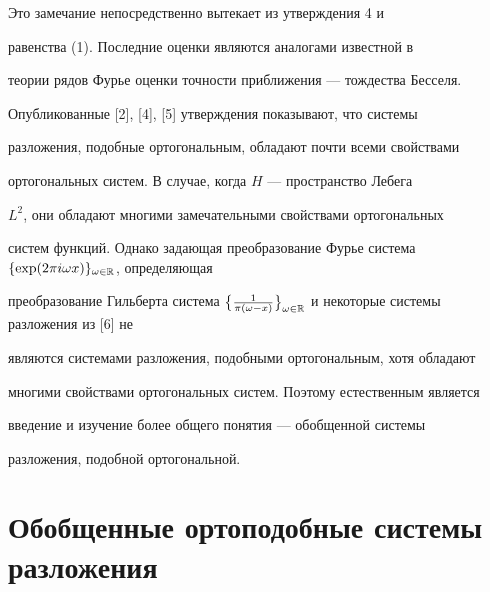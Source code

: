 Это замечание непосредственно вытекает из утверждения 4 и


равенства (1). Последние оценки являются аналогами известной в


теории рядов Фурье оценки точности приближения --- тождества Бесселя.





Опубликованные [2], [4], [5] утверждения показывают, что системы


разложения, подобные ортогональным, обладают почти всеми свойствами


ортогональных систем. В случае, когда $H$ --- пространство Лебега


$L^2$, они обладают многими замечательными свойствами ортогональных


систем функций. Однако задающая преобразование Фурье система $\{\text


{exp}(2\pi i\omega x)\}_{\omega\in\Bbb R}$, определяющая


преобразование Гильберта система $\big\{\frac1{\pi(\omega-x)}


\big\}_{\omega\in\Bbb R}$ и некоторые системы разложения из [6] не


являются системами разложения, подобными ортогональным, хотя обладают


многими свойствами ортогональных систем. Поэтому естественным является


введение и изучение более общего понятия --- обобщенной системы


разложения, подобной ортогональной.





\section{Обобщенные ортоподобные системы разложения}






